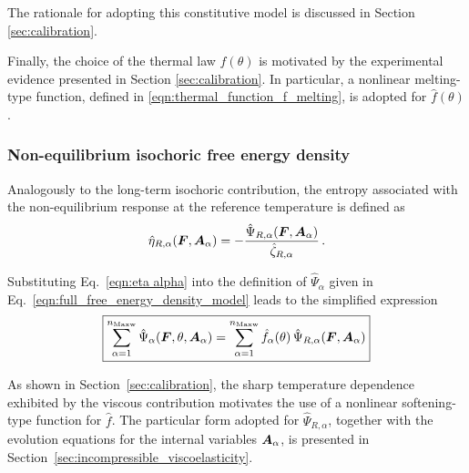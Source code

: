 The rationale for adopting this constitutive model is discussed in Section \ref{sec:calibration}.

Finally, the choice of the thermal law $\hat{f}(\theta)$ is motivated by the experimental evidence presented in Section \ref{sec:calibration}. In particular, a nonlinear melting-type function, defined in \eqref{eqn:thermal_function_f_melting}, is adopted for $\hat{f}(\theta)$.


\subsubsection{Non-equilibrium isochoric free energy density} \label{sec:viscoelastic_model}


Analogously to the long-term isochoric contribution, the entropy associated with the non-equilibrium response at the reference temperature is defined as
%
\begin{equation}
	\label{eqn:eta alpha}
	\hat{\eta}_{R,\alpha}(\boldsymbol{F},\boldsymbol{A}_{\alpha})
	=
	-\frac{\hat{\Psi}_{R,\alpha}(\boldsymbol{F},\boldsymbol{A}_{\alpha})}
	{\hat{\zeta}_{R,\alpha}} \, .
\end{equation}

Substituting Eq.~\eqref{eqn:eta alpha} into the definition of $\hat{\Psi}_{\alpha}$ given in Eq.~\eqref{eqn:full_free_energy_density_model} leads to the simplified expression
%
\begin{equation}	\label{eqn:final hat psi alpha}
	\boxed{		\sum_{\alpha=1}^{n_{\text{Maxw}}}
		\hat{\Psi}_{\alpha}
		(\boldsymbol{F},\theta,\boldsymbol{A}_{\alpha})
		=
		\sum_{\alpha=1}^{n_{\text{Maxw}}}\hat{f}_{\alpha}(\theta)\,
		\hat{\Psi}_{R,\alpha}
		(\boldsymbol{F},\boldsymbol{A}_{\alpha})
	}
\end{equation}

As shown in Section~\ref{sec:calibration}, the sharp temperature dependence exhibited by the viscous contribution motivates the use of a nonlinear softening-type function for $\hat{f}$. The particular form adopted for $\hat{\Psi}_{R,\alpha}$, together with the evolution equations for the internal variables $\boldsymbol{A}_{\alpha}$, is presented in Section~\ref{sec:incompressible_viscoelasticity}.





